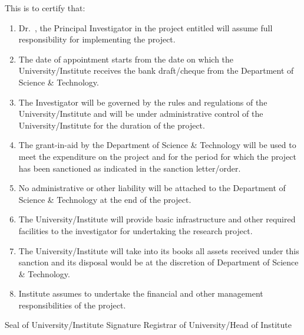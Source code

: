 \documentclass[11pt]{article}
\begin{document}
This is to certify that:
\begin{enumerate}[label=\Roman*.]
  \item Dr.~\underline{\hspace{6cm}}, the Principal Investigator in the project entitled \underline{\hspace{12cm}}will assume full responsibility for implementing the project.
  \item The date of appointment starts from the date on which the University/Institute receives the bank draft/cheque from the Department of Science \& Technology.
  \item The Investigator will be governed by the rules and regulations of the University/Institute and will be under administrative control of the University/Institute for the duration of the project.
  \item The grant-in-aid by the Department of Science \& Technology will be used to meet the expenditure on the project and for the period for which the project has been sanctioned as indicated in the sanction letter/order.
  \item No administrative or other liability will be attached to the Department of Science \& Technology at the end of the project.
  \item The University/Institute will provide basic infrastructure and other required facilities to the investigator for undertaking the research project.
  \item The University/Institute will take into its books all assets received under this sanction and its disposal would be at the discretion of Department of Science \& Technology.
  \item Institute assumes to undertake the financial and other management responsibilities of the project.
\end{enumerate}

\vspace{5cm}
Seal of University/Institute Signature \hfill Registrar of University/Head of Institute
\end{document}
